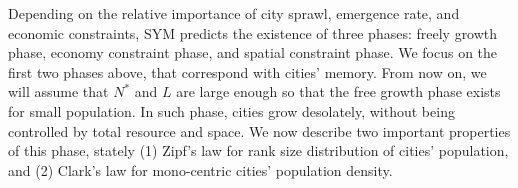 \documentclass[reprint,unsortedaddress,amsmath,amssymb,aps,prl,showkeys]{revtex4-2}
\begin{document}


Depending on the relative importance of city sprawl, emergence rate, and economic constraints, SYM predicts the existence of three phases: freely growth phase, economy constraint phase, and spatial constraint phase. We focus on the first two phases above, that correspond with cities' memory. From now on, we will assume that $N^*$ and $L$ are large enough so that the free growth phase exists for small population. In such phase, cities grow desolately, without being controlled by total resource and space. We now describe two important properties of this phase, stately (1) Zipf's law\cite{gabaix1999zipf's} for rank size distribution of cities' population, and (2) Clark's law for mono-centric cities' population density. 
\end{document}
